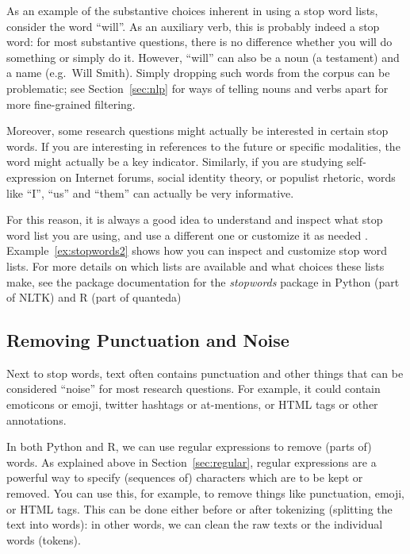 As an example of the substantive choices inherent in using a stop word lists,
consider the word ``will''.
As an auxiliary verb, this is probably indeed a stop word: for most substantive questions, there is no difference
whether you will do something or simply do it.
However, ``will'' can also be a noun (a testament) and a name (e.g.\ Will Smith).
Simply dropping such words from the corpus can be problematic; see Section~\ref{sec:nlp} for ways of telling nouns and verbs apart
for more fine-grained filtering.

Moreover, some research questions might actually be interested in certain stop words.
If you are interesting in references to the future or specific modalities,
the word might actually be a key indicator.
Similarly, if you are studying self-expression on Internet forums, social identity theory, or populist rhetoric,
words like ``I'', ``us'' and ``them'' can actually be very informative.

For this reason, it is always a good idea to understand and inspect what stop word list you are using,
and use a different one or customize it as needed \citep[see also][]{nothman18}.
Example~\ref{ex:stopwords2} shows how you can inspect and customize stop word lists.
For more details on which lists are available and what choices these lists make,
see the package documentation for the \emph{stopwords} package in Python (part of NLTK) and R (part of quanteda)




\subsection{Removing Punctuation and Noise}\label{sec:punctuation}


Next to stop words, text often contains punctuation and other things that can be considered ``noise'' for most research questions.
For example, it could contain emoticons or emoji, twitter hashtags or at-mentions, or HTML tags or other annotations.

In both Python and R, we can use regular expressions to remove (parts of) words.
As explained above in Section~\ref{sec:regular}, regular expressions are a powerful way to specify (sequences of) characters which are to be kept or removed.
You can use this, for example, to remove things like punctuation, emoji, or HTML tags.
This can be done either before or after tokenizing (splitting the text into words):
in other words, we can clean the raw texts or the individual words (tokens).

